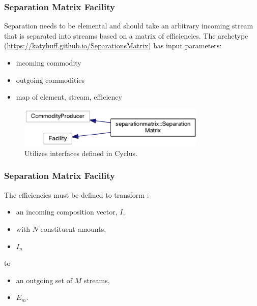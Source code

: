 \begin{frame}[fragile]
  \frametitle{Separation Matrix Facility}
Separation needs to be elemental and should take an arbitrary incoming stream 
that is separated into streams based on a matrix of efficiencies. The archetype 
(\url{https://katyhuff.github.io/SeparationsMatrix})\cite{huff_market_2014}
has input parameters:

\begin{itemize}
\item incoming commodity
\item outgoing commodities
\item map of element, stream, efficiency
\end{itemize}
\begin{figure}[htbp!]
\begin{center}
\includegraphics[width=0.8\textwidth]{sm_inherit}
\end{center}
\caption{Utilizes interfaces defined in Cyclus.}
\label{fig:sm_inherit}
\end{figure}
\end{frame}
\begin{frame}[fragile]
  \frametitle{Separation Matrix Facility}
The efficiencies must be defined to transform :
\begin{itemize}
 \item an incoming composition vector, $I$, 
 \item with $N$ constituent amounts, 
 \item $I_n$ 
\end{itemize}
to 
\begin{itemize}
\item an outgoing set of $M$ streams,
\item $E_m$.
\end{itemize}

\end{frame}
